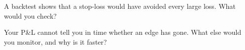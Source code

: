 \begin{interviewq}\label{iq:fm:managing-a-book-through-drawdown:5}
A backtest shows that a stop-loss would have avoided every large loss. What would you check?
\end{interviewq}

\begin{interviewq}\label{iq:fm:managing-a-book-through-drawdown:6}
Your P\&L cannot tell you in time whether an edge has gone. What else would you monitor, and why is it faster?
\end{interviewq}
